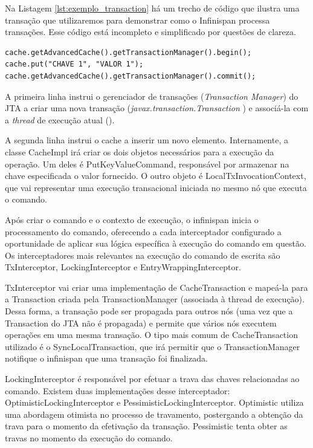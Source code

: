 \documentclass[11pt,twoside,a4paper]{book}
\begin{document}
Na Listagem \ref{lst:exemplo_transaction} há um trecho de código que ilustra uma transação que utilizaremos para demonstrar como o Infinispan processa transações. Esse código está incompleto e simplificado por questões de clareza.

\begin{lstlisting}[caption={Transação convencional}, label=lst:exemplo_transaction]
cache.getAdvancedCache().getTransactionManager().begin();
cache.put("CHAVE 1", "VALOR 1");
cache.getAdvancedCache().getTransactionManager().commit();
\end{lstlisting}

A primeira linha instrui o gerenciador de transações (\emph{Transaction Manager}) do JTA a criar uma nova transação (\emph{javax.transaction.Transaction} \cite{jta}) e associá-la com a \emph{thread} de execução atual (\cite{ipc}). 

A segunda linha instrui o cache a inserir um novo elemento. Internamente, a classe CacheImpl irá criar os dois objetos necessários para a execução da operação. Um deles é PutKeyValueCommand, responsável por armazenar na chave especificada o valor fornecido. O outro objeto é LocalTxInvocationContext, que vai representar uma execução transacional iniciada no mesmo nó que executa o comando. 

Após criar o comando e o contexto de execução, o infinispan inicia o processamento do comando, oferecendo a cada interceptador configurado a oportunidade de aplicar sua lógica específica à execução do comando em questão. Os interceptadores mais relevantes na execução do comando de escrita são TxInterceptor, LockingInterceptor e EntryWrappingInterceptor.

TxInterceptor vai criar uma implementação de CacheTransaction e mapeá-la para a Transaction criada pela TransactionManager (associada à thread de execução). Dessa forma, a transação pode ser propagada para outros nós (uma vez que a Transaction do JTA não é propagada) e permite que vários nós executem operações em uma mesma transação. O tipo mais comum de CacheTransaction utilizado é o SyncLocalTransaction, que irá permitir que o TransactionManager notifique o infinispan que uma transação foi finalizada.

LockingInterceptor é responsável por efetuar a trava das chaves relacionadas ao comando. Existem duas implementações desse interceptador: OptimisticLockingInterceptor e PessimisticLockingInterceptor. Optimistic utiliza uma abordagem otimista no processo de travamento, postergando a obtenção da trava para o momento da efetivação da transação. Pessimistic tenta obter as travas no momento da execução do comando.
\end{document}
